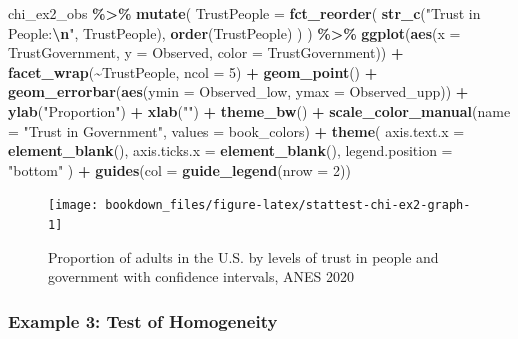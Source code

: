 \documentclass[
]{krantz}
\makeatletter
\newenvironment{Shaded}{\begin{snugshade}}{\end{snugshade}}
\newcommand{\AttributeTok}[1]{\textcolor[rgb]{0.27,0.27,0.27}{#1}}
\newcommand{\DecValTok}[1]{\textcolor[rgb]{0.06,0.06,0.06}{#1}}
\newcommand{\FunctionTok}[1]{\textcolor[rgb]{0.27,0.27,0.27}{\textbf{#1}}}
\newcommand{\NormalTok}[1]{#1}
\newcommand{\SpecialCharTok}[1]{\textcolor[rgb]{0.43,0.43,0.43}{\textbf{#1}}}
\newcommand{\StringTok}[1]{\textcolor[rgb]{0.5,0.5,0.5}{#1}}
\newenvironment{kframe}{%
\medskip{}
\setlength{\fboxsep}{.8em}
 \def\at@end@of@kframe{}%
 \ifinner\ifhmode%
  \def\at@end@of@kframe{\end{minipage}}%
  \begin{minipage}{\columnwidth}%
 \fi\fi%
 \def\FrameCommand##1{\hskip\@totalleftmargin \hskip-\fboxsep
 \colorbox{shadecolor}{##1}\hskip-\fboxsep
     \hskip-\linewidth \hskip-\@totalleftmargin \hskip\columnwidth}%
 \MakeFramed {\advance\hsize-\width
   \@totalleftmargin\z@ \linewidth\hsize
   \@setminipage}}%
 {\par\unskip\endMakeFramed%
 \at@end@of@kframe}
\renewenvironment{Shaded}{\begin{kframe}}{\end{kframe}}
\makeatother
\begin{document}
\begin{Shaded}
\begin{Highlighting}[]
\NormalTok{chi\_ex2\_obs }\SpecialCharTok{\%\textgreater{}\%}
  \FunctionTok{mutate}\NormalTok{(}
    \AttributeTok{TrustPeople =}
      \FunctionTok{fct\_reorder}\NormalTok{(}
        \FunctionTok{str\_c}\NormalTok{(}\StringTok{"Trust in People:}\SpecialCharTok{\textbackslash{}n}\StringTok{"}\NormalTok{, TrustPeople),}
        \FunctionTok{order}\NormalTok{(TrustPeople)}
\NormalTok{      )}
\NormalTok{  ) }\SpecialCharTok{\%\textgreater{}\%}
  \FunctionTok{ggplot}\NormalTok{(}\FunctionTok{aes}\NormalTok{(}\AttributeTok{x =}\NormalTok{ TrustGovernment, }\AttributeTok{y =}\NormalTok{ Observed, }\AttributeTok{color =}\NormalTok{ TrustGovernment)) }\SpecialCharTok{+}
  \FunctionTok{facet\_wrap}\NormalTok{(}\SpecialCharTok{\textasciitilde{}}\NormalTok{TrustPeople, }\AttributeTok{ncol =} \DecValTok{5}\NormalTok{) }\SpecialCharTok{+}
  \FunctionTok{geom\_point}\NormalTok{() }\SpecialCharTok{+}
  \FunctionTok{geom\_errorbar}\NormalTok{(}\FunctionTok{aes}\NormalTok{(}\AttributeTok{ymin =}\NormalTok{ Observed\_low, }\AttributeTok{ymax =}\NormalTok{ Observed\_upp)) }\SpecialCharTok{+}
  \FunctionTok{ylab}\NormalTok{(}\StringTok{"Proportion"}\NormalTok{) }\SpecialCharTok{+}
  \FunctionTok{xlab}\NormalTok{(}\StringTok{""}\NormalTok{) }\SpecialCharTok{+}
  \FunctionTok{theme\_bw}\NormalTok{() }\SpecialCharTok{+}
  \FunctionTok{scale\_color\_manual}\NormalTok{(}\AttributeTok{name =} \StringTok{"Trust in Government"}\NormalTok{, }\AttributeTok{values =}\NormalTok{ book\_colors) }\SpecialCharTok{+}
  \FunctionTok{theme}\NormalTok{(}
    \AttributeTok{axis.text.x =} \FunctionTok{element\_blank}\NormalTok{(),}
    \AttributeTok{axis.ticks.x =} \FunctionTok{element\_blank}\NormalTok{(),}
    \AttributeTok{legend.position =} \StringTok{"bottom"}
\NormalTok{  ) }\SpecialCharTok{+}
  \FunctionTok{guides}\NormalTok{(}\AttributeTok{col =} \FunctionTok{guide\_legend}\NormalTok{(}\AttributeTok{nrow =} \DecValTok{2}\NormalTok{))}
\end{Highlighting}
\end{Shaded}

\begin{figure}
\texttt{[image: bookdown\_files/figure-latex/stattest-chi-ex2-graph-1]} \caption{Proportion of adults in the U.S. by levels of trust in people and government with confidence intervals, ANES 2020}\label{fig:stattest-chi-ex2-graph}
\end{figure}

\hypertarget{stattest-chi-ex3}{%
\subsubsection*{Example 3: Test of Homogeneity}\label{stattest-chi-ex3}}
\end{document}
